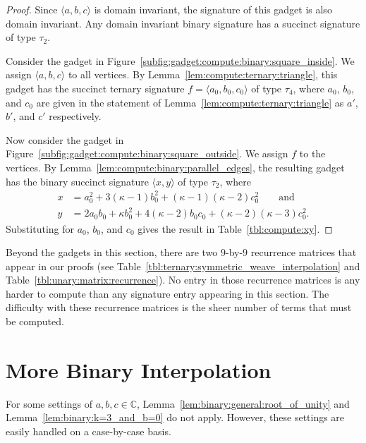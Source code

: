 \documentclass[11pt]{article}
\begin{document}
\begin{proof}
 Since $\langle a,b,c \rangle$ is domain invariant,
 the signature of this gadget is also domain invariant.
 Any domain invariant binary signature has a succinct signature of type $\tau_2$.
 
 Consider the gadget in Figure~\ref{subfig:gadget:compute:binary:square_inside}.
 We assign $\langle a,b,c \rangle$ to all vertices.
 By Lemma~\ref{lem:compute:ternary:triangle},
 this gadget has the succinct ternary signature $f = \langle a_0, b_0, c_0 \rangle$ of type $\tau_4$,
 where $a_0$, $b_0$, and $c_0$ are given in the statement of Lemma~\ref{lem:compute:ternary:triangle} as $a'$, $b'$, and $c'$ respectively.
 
 Now consider the gadget in Figure~\ref{subfig:gadget:compute:binary:square_outside}.
 We assign $f$ to the vertices.
 By Lemma~\ref{lem:compute:binary:parallel_edges},
 the resulting gadget has the binary succinct signature $\langle x,y \rangle$ of type $\tau_2$,
 where
 \begin{align*}
  x &=   a_0^2
       + 3 (\kappa - 1) b_0^2
       + (\kappa - 1) (\kappa - 2) c_0^2
       \qquad \text{and}\\
  y &=   2 a_0 b_0
       + \kappa b_0^2
       + 4 (\kappa - 2) b_0 c_0
       + (\kappa - 2) (\kappa - 3) c_0^2.
 \end{align*}
 Substituting for $a_0$, $b_0$, and $c_0$ gives the result in Table~\ref{tbl:compute:xy}.
\end{proof}

Beyond the gadgets in this section,
there are two $9$-by-$9$ recurrence matrices that appear in our proofs (see Table~\ref{tbl:ternary:symmetric_weave_interpolation} and Table~\ref{tbl:unary:matrix:recurrence}).
No entry in those recurrence matrices is any harder to compute than any signature entry appearing in this section.
The difficulty with these recurrence matrices is the sheer number of terms that must be computed.

\section{More Binary Interpolation} \label{sec:appendix:binary}

For some settings of $a,b,c \in \mathbb{C}$,
Lemma~\ref{lem:binary:general:root_of_unity} and Lemma~\ref{lem:binary:k=3_and_b=0} do not apply.
However, these settings are easily handled on a case-by-case basis.
\end{document}
